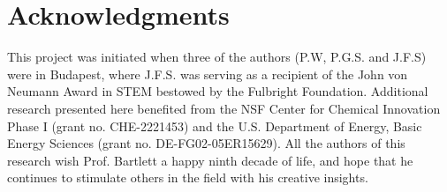 \documentclass[12pt,a4paper,prb,aps,superscriptaddress]{revtex4}
\begin{document}
\section{Acknowledgments} 

This project was initiated when three of the authors (P.W, P.G.S. and J.F.S)
were in Budapest, where J.F.S. was serving as a recipient of the John von
Neumann Award in STEM bestowed by the Fulbright Foundation. Additional
research presented here benefited from the NSF Center for Chemical Innovation
Phase I (grant no. CHE-2221453) and the U.S. Department of Energy, Basic Energy
Sciences (grant no. DE-FG02-05ER15629).  All the authors of this research wish
Prof. Bartlett a happy ninth decade of life, and hope that he continues to
stimulate others in the field with his creative insights.

\clearpage


\end{document}
